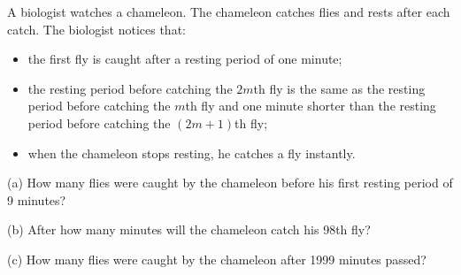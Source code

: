 A biologist watches a chameleon. The chameleon catches flies and rests after each catch. The biologist notices that:
\begin{itemize}
\item[(i)] the first fly is caught after a resting period of one minute;
\item[(ii)] the resting period before catching the $2m$th fly is the same as the resting period before catching the $m$th fly and one minute shorter than the resting period before catching the $(2m+1)$th fly;
\item[(iii)] when the chameleon stops resting, he catches a fly instantly.
\end{itemize}
(a) How many flies were caught by the chameleon before his first resting period of 9 minutes?

(b) After how many minutes will the chameleon catch his 98th fly?

(c) How many flies were caught by the chameleon after 1999 minutes passed?
